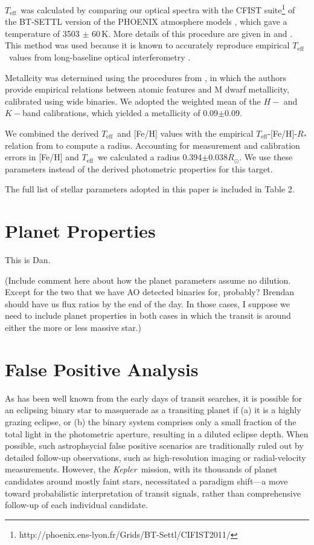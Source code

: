 \documentclass{emulateapj}
\newcommand{\project}[1]{\textsl{#1}}
\newcommand{\kep}{\project{Kepler}}
\newcommand\teff{\ensuremath{T_\text{eff}}}
\begin{document}
\teff\ was calculated by comparing our optical spectra with the CFIST
suite\footnote{http://phoenix.ens-lyon.fr/Grids/BT-Settl/CIFIST2011/} of the BT-SETTL
version of the PHOENIX atmosphere models \citep{Allard13}, which gave a temperature
of 3503 $\pm$ 60\,K. 
More details of this procedure are given in \citet{Mann14} and
\citet{Gaidos14}. 
This method was used because it is known to accurately reproduce empirical 
\teff\ values from long-baseline optical interferometry \citet{Boyajian12}. 

Metallcity was determined using the procedures from \citet{Mann13a}, in which the
authors provide empirical relations between atomic features and M dwarf
metallicity, calibrated using wide binaries. 
We adopted the weighted mean of the $H-$ and $K-$band calibrations, 
which yielded a metallicity of 0.09$\pm$0.09.

We combined the derived \teff\ and [Fe/H] values with the empirical 
\teff-[Fe/H]-$R_*$ relation from \citet{Mann15} to compute a radius. 
Accounting for measurement and calibration errors in [Fe/H] and \teff\ we calculated 
a radius 0.394$\pm0.038R_\odot$. 
We use these parameters instead of the derived photometric properties for this target.

The full list of stellar parameters adopted in this paper is included in
Table 2.

\section{Planet Properties}

This is Dan.

(Include comment here about how the planet parameters assume no dilution. 
Except for the two that we have AO detected binaries for, probably?
Brendan should have us flux ratios by the end of the day.
In those cases, I suppose we need to include planet properties in both cases
in which the transit is around either the more or less massive star.)

\section{False Positive Analysis}
As has been well known from the early days of transit searches, it is 
possible for an eclipsing binary star to masquerade as a transiting 
planet if (a) it is a highly grazing eclipse, or (b) the binary system
comprises only a small fraction of the total light in the photometric
aperture, resulting in a diluted eclipse depth.
When possible, such astrophsycial false positive scenarios are traditionally
ruled out by detailed follow-up observations, such as high-resolution
imaging or radial-velocity measurements.  
However, the \kep\ mission, with its thousands of planet candidates
around mostly faint stars, necessitated a paradigm shift---a move 
toward probabilistic interpretation of transit signals, rather than 
comprehensive follow-up of each individual candidate.
\end{document}
